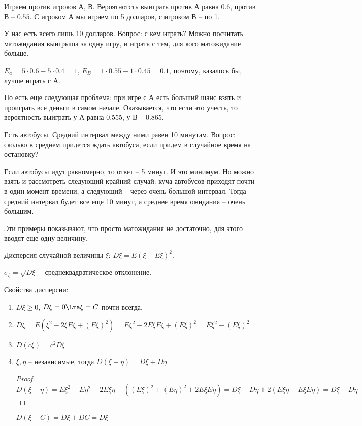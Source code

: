 \begin{exmp}

Играем против игроков А, В. Вероятнотсть выиграть против А равна $0.6$, против В -- $0.55$. 
С игроком А мы играем по 5 долларов, с игроком В -- по 1.

У нас есть всего лишь 10 долларов. Вопрос: с кем играть?
Можно посчитать матожидания выигрыша за одну игру, и играть с тем, для кого матожидание больше.

$E_a = 5 \cdot 0.6 - 5 \cdot 0.4 = 1$, $E_B = 1 \cdot 0.55 - 1 \cdot 0.45 = 0.1$, поэтому, казалось бы, лучше играть с А.

Но есть еще следующая проблема: при игре с А есть больший шанс взять и проиграть все деньги в самом 
начале. Оказывается, что если это учесть, то вероятность выиграть у А равна 0.555, у В -- 0.865.

\end{exmp}

\begin{exmp}

Есть автобусы. Средний интервал между ними равен 10 минутам. Вопрос: сколько в среднем придется ждать автобуса, если придем в случайное время на остановку?

Если автобусы идут равномерно, то ответ -- 5 минут. И это минимум.
Но можно взять и рассмотреть следующий крайний случай: куча автобусов приходят почти в один момент времени, а следующий -- через очень большой интервал. 
Тогда средний интервал будет все еще 10 минут, а среднее время ожидания -- очень большим.
\end{exmp}

Эти примеры показывают, что просто матожидания не достаточно, для этого вводят еще одну величину.

\begin{Def}
Дисперсия случайной величины $\xi$: $D\xi = E (\xi - E\xi)^2$.

$\sigma_\xi = \sqrt{D\xi}$ -- среднеквадратическое отклонение.
\end{Def}

Свойства дисперсии:
\begin{enumerate}
\item $D\xi \geq 0$, $D \xi = 0 \Lra \xi = C$ почти всегда. 

\item $D \xi = E (\xi ^2 - 2\xi E\xi + (E \xi) ^ 2) = E\xi^2 - 2E\xi E\xi + (E\xi) ^2 = E\xi^2 - (E\xi)^2$

\item $D(c \xi) = c^2 D \xi$

\item $\xi, \eta$ -- независимые, тогда $D(\xi + \eta) = D\xi + D\eta$
\begin{proof}
$D(\xi + \eta) = E\xi^2 + E\eta^2 + 2E\xi\eta - ((E\xi)^2 + (E\eta)^2+ 2E\xi E\eta) = D\xi + D\eta + 2(E\xi \eta - E \xi E\eta) = D\xi + D\eta$
\end{proof}
\begin{conseq}
$D(\xi + C) = D\xi + DC = D\xi$
\end{conseq}
\end{enumerate}

